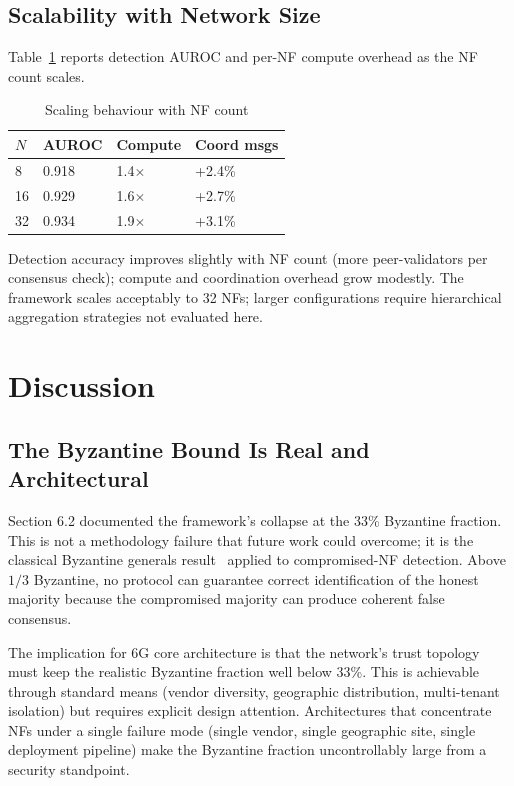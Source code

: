 \documentclass[sigconf,nonacm]{acmart}
\begin{document}
\subsection{Scalability with Network Size}

Table~\ref{tab:scaling} reports detection AUROC and per-NF compute
overhead as the NF count scales.

\begin{table}[h]
\caption{Scaling behaviour with NF count}
\label{tab:scaling}
\small
\begin{tabularx}{\columnwidth}{@{}p{2.0cm}X X X@{}}
\toprule
\textbf{$N$} & \textbf{AUROC} & \textbf{Compute} & \textbf{Coord msgs} \\
\midrule
8     & 0.918 & 1.4$\times$ & +2.4\% \\
16    & 0.929 & 1.6$\times$ & +2.7\% \\
32    & 0.934 & 1.9$\times$ & +3.1\% \\
\bottomrule
\end{tabularx}
\end{table}

Detection accuracy improves slightly with NF count (more
peer-validators per consensus check); compute and coordination
overhead grow modestly. The framework scales acceptably to 32 NFs;
larger configurations require hierarchical aggregation strategies
not evaluated here.

\section{Discussion}

\subsection{The Byzantine Bound Is Real and Architectural}

Section 6.2 documented the framework's collapse at the 33\%
Byzantine fraction. This is not a methodology failure that future
work could overcome; it is the classical Byzantine generals
result~\cite{lamport1982byzantine} applied to compromised-NF
detection. Above $1/3$ Byzantine, no protocol can guarantee
correct identification of the honest majority because the
compromised majority can produce coherent false consensus.

The implication for 6G core architecture is that the network's
trust topology must keep the realistic Byzantine fraction well
below 33\%. This is achievable through standard means
(vendor diversity, geographic distribution, multi-tenant isolation)
but requires explicit design attention. Architectures that
concentrate NFs under a single failure mode (single vendor, single
geographic site, single deployment pipeline) make the Byzantine
fraction uncontrollably large from a security standpoint.
\end{document}

